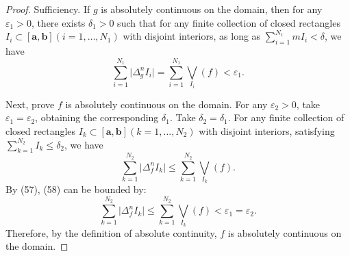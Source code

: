 \documentclass{ijclclp}
\begin{document}
\begin{proof}
    Sufficiency. If \(g\) is absolutely continuous on the domain, then for any \(\varepsilon_1>0\), there exists \(\delta_1>0\) such that for any finite collection of closed rectangles \(I_i\subset[\boldsymbol{a},\boldsymbol{b}](i=1,\dots,N_1)\) with disjoint interiors, as long as \(\sum\limits_{i=1}^{N_1}mI_i<\delta\), we have
    \begin{equation}
        \sum\limits_{i=1}^{N_1}\lvert\Delta_g^nI_i\rvert=\sum\limits_{i=1}^{N_1}\bigvee_{I_i}(f)<\varepsilon_1.
    \end{equation}

    Next, prove \(f\) is absolutely continuous on the domain. For any \(\varepsilon_2>0\), take \(\varepsilon_1=\varepsilon_2\), obtaining the corresponding \(\delta_1\). Take \(\delta_2=\delta_1\). For any finite collection of closed rectangles \(I_k\subset[\boldsymbol{a},\boldsymbol{b}](k=1,\dots,N_2)\) with disjoint interiors, satisfying \(\sum\limits_{k=1}^{N_2}I_k\leq\delta_2\), we have
    \begin{equation}
        \sum_{k=1}^{N_2}\lvert\Delta_f^nI_k\rvert\leq\sum_{k=1}^{N_2}\bigvee_{I_k}(f).
    \end{equation}
    By (57), (58) can be bounded by:
    \[\sum_{k=1}^{N_2}\lvert\Delta_f^nI_k\rvert\leq\sum_{k=1}^{N_2}\bigvee_{I_k}(f)<\varepsilon_1=\varepsilon_2.\]
    Therefore, by the definition of absolute continuity, \(f\) is absolutely continuous on the domain.
\end{proof}
\end{document}
